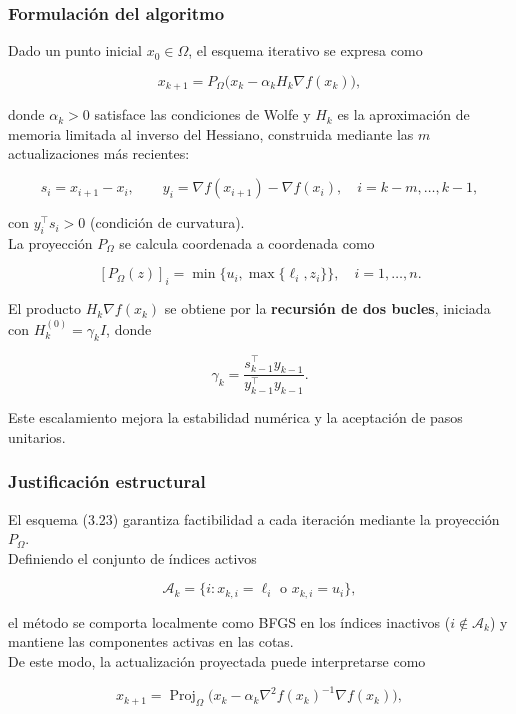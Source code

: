 \documentclass[
  spanish,
  us-letterpaper,
  DIV=11,
  numbers=noendperiod]{scrreprt}
\numberwithin{equation}{section}
\begin{document}
\subsubsection{Formulación del
algoritmo}\label{formulaciuxf3n-del-algoritmo}

Dado un punto inicial \(x_0 \in \Omega\), el esquema iterativo se
expresa como

\[
x_{k+1} = P_\Omega\big(x_k - \alpha_k H_k \nabla f(x_k)\big), \tag{3.23}
\]

donde \(\alpha_k > 0\) satisface las condiciones de Wolfe y \(H_k\) es
la aproximación de memoria limitada al inverso del Hessiano, construida
mediante las \(m\) actualizaciones más recientes:

\[
s_i = x_{i+1} - x_i, \qquad
y_i = \nabla f(x_{i+1}) - \nabla f(x_i), \quad i = k-m,\dots,k-1,
\]

con \(y_i^\top s_i > 0\) (condición de curvatura).\\
La proyección \(P_\Omega\) se calcula coordenada a coordenada como

\[
[P_\Omega(z)]_i = \min\{u_i, \max\{\ell_i, z_i\}\}, \quad i=1,\dots,n. \tag{3.24}
\]

El producto \(H_k \nabla f(x_k)\) se obtiene por la \textbf{recursión de
dos bucles}, iniciada con \(H_k^{(0)} = \gamma_k I\), donde

\[
\gamma_k = \frac{s_{k-1}^\top y_{k-1}}{y_{k-1}^\top y_{k-1}}. \tag{3.25}
\]

Este escalamiento mejora la estabilidad numérica y la aceptación de
pasos unitarios.

\subsubsection{Justificación
estructural}\label{justificaciuxf3n-estructural}

El esquema (3.23) garantiza factibilidad a cada iteración mediante la
proyección \(P_\Omega\).\\
Definiendo el conjunto de índices activos

\[
\mathcal{A}_k = \{i : x_{k,i} = \ell_i \text{ o } x_{k,i} = u_i\},
\]

el método se comporta localmente como BFGS en los índices inactivos
(\(i \notin \mathcal{A}_k\)) y mantiene las componentes activas en las
cotas.\\
De este modo, la actualización proyectada puede interpretarse como

\[
x_{k+1} = \operatorname{Proj}_\Omega\big(x_k - \alpha_k \nabla^2 f(x_k)^{-1} \nabla f(x_k)\big),
\]
\end{document}
